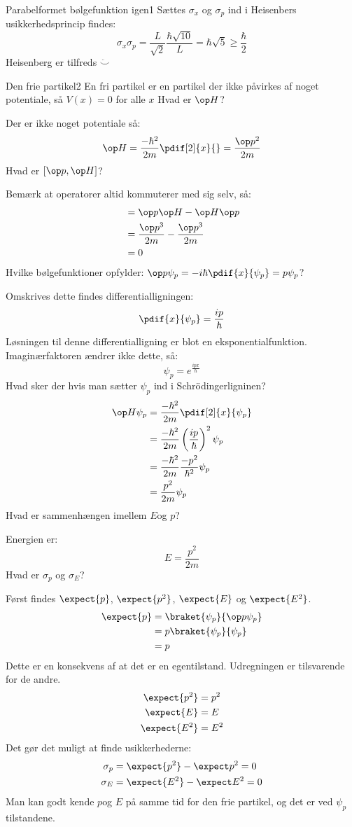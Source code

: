 \begin{opgave}{Parabelformet bølgefunktion igen}{1}
Sættes $\sigma_x$ og $\sigma_p$ ind i Heisenbers usikkerhedsprincip findes:
$$
\sigma_x\sigma_p = \frac{L}{\sqrt{2}}\frac{\hbar\sqrt{10}}{L}= \hbar\sqrt{5}\geq\frac{\hbar}{2}
$$
Heisenberg er tilfreds $\ddot \smile$
\end{opgave}

\begin{opgave}{Den frie partikel}{2}
En fri partikel er en partikel der ikke påvirkes af noget potentiale, så $V(x)=0$ for alle $x$
\opg Hvad er $\op H$?

Der er ikke noget potentiale så:
$$
\op H = \frac{-\hbar^2}{2m}\pdif[2]{x}{} = \frac{\op p^2}{2m}
$$
\opg Hvad er $[\op p,\op H]$?

Bemærk at operatorer altid kommuterer med sig selv, så:
\begin{align*}
    [\op p,\op H]&= \op p\op H-\op H\op p\\
    &= \frac{\op p^3}{2m}-\frac{\op p^3}{2m}\\
    &= 0
\end{align*}
\opg Hvilke bølgefunktioner opfylder: $\op p \psi_p = -i\hbar\pdif{x}{\psi_p} = p\psi_p$?

Omskrives dette findes differentialligningen:
$$
\pdif{x}{\psi_p}=\frac{ip}{\hbar}
$$
Løsningen til denne differentialligning er blot en eksponentialfunktion. Imaginærfaktoren ændrer ikke dette, så:
$$
\psi_p = e^{\frac{ipx}{\hbar}}
$$
\opg Hvad sker der hvis man sætter $\psi_p$ ind i Schrödingerligninen?
\begin{align*}
    \op H\psi_p &= \frac{-\hbar^2}{2m}\pdif[2]{x}{\psi_p}\\
    &= \frac{-\hbar^2}{2m}\left(\frac{ip}{\hbar}\right)^2\psi_p\\
    &= \frac{-\hbar^2}{2m}\frac{-p^2}{\hbar^2}\psi_p\\
    &=\frac{p^2}{2m}\psi_p
\end{align*}
\opg Hvad er sammenhængen imellem $E$og $p$?

Energien er:
$$
E=\frac{p^2}{2m}
$$
\opg Hvad er $\sigma_p$ og $\sigma_E$?

Først findes $\expect{p}$, $\expect{p^2}$, $\expect{E}$ og $\expect{E^2}$.
\begin{align*}
    \expect{p} &= \braket{\psi_p}{\op p\psi_p}\\
    &= p\braket{\psi_p}{\psi_p}\\
    &=p
\end{align*}
Dette er en konsekvens af at det er en egentilstand. Udregningen er tilsvarende for de andre.
\begin{align*}
    \expect{p^2} &= p^2\\
    \expect{E} &= E\\
    \expect{E^2} &= E^2
\end{align*}
Det gør det muligt at finde usikkerhederne:
\begin{align*}
    \sigma_p &= \expect{p^2}-\expect p^2 = 0\\
    \sigma_E &= \expect{E^2}-\expect E^2 = 0
\end{align*}
Man kan godt kende $p$og $E$ på samme tid for den frie partikel, og det er ved $\psi_p$ tilstandene.
\end{opgave}

